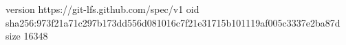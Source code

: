 version https://git-lfs.github.com/spec/v1
oid sha256:973f21a71c297b173dd556d081016c7f21e31715b101119af005c3337e2ba87d
size 16348
